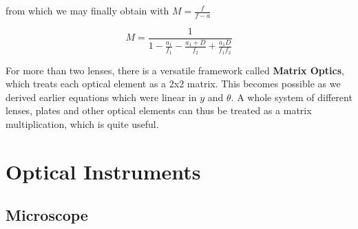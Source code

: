 \documentclass[
  a4paper,
]{book}
\begin{document}
from which we may finally obtain with \(M=\frac{f}{f-a}\)

\[M=\frac{1}{1-\frac{a_1}{f_1}-\frac{a_1+D}{f_2}+\frac{a_1D}{f_1 f_2}}\]

For more than two lenses, there is a versatile framework called
\textbf{Matrix Optics}, which treats each optical element as a 2x2
matrix. This becomes possible as we derived earlier equations which were
linear in \(y\) and \(\theta\). A whole system of different lenses,
plates and other optical elements can thus be treated as a matrix
multiplication, which is quite useful.

\chapter{Optical Instruments}\label{optical-instruments-2}

\section{Microscope}\label{microscope}
\end{document}
